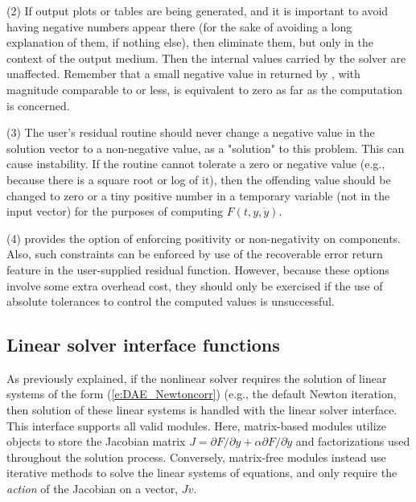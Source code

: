 (2) If output plots or tables are being generated, and it is important
to avoid having negative numbers appear there (for the sake of avoiding
a long explanation of them, if nothing else), then eliminate them, but
only in the context of the output medium.  Then the internal values carried
by the solver are unaffected.  Remember that a small negative value in 
returned by {\ida}, with magnitude comparable to  or less,
is equivalent to zero as far as the computation is concerned.

(3) The user's residual routine  should never change a
negative value in the solution vector  to a non-negative value,
as a "solution" to this problem.  This can cause instability.  If the
 routine cannot tolerate a zero or negative value (e.g., because
there is a square root or log of it), then the offending value should
be changed to zero or a tiny positive number in a temporary variable
(not in the input  vector) for the purposes of computing $F(t,y,\dot{y})$.

(4) {\ida} provides the option of enforcing positivity or non-negativity
on components.  Also, such constraints can be enforced by use of the
recoverable error return feature in the user-supplied residual function.
However, because these options involve some extra overhead cost, they
should only be exercised if the use of absolute tolerances to control
the computed values is unsuccessful.
\subsection{Linear solver interface functions}\label{sss:lin_solv_init}

As previously explained, if the nonlinear solver requires the solution of
linear systems of the form (\ref{e:DAE_Newtoncorr}) (e.g., the default Newton
iteration, then solution of these linear systems is handled with the
{\idals} linear solver interface.  This interface supports all valid
{\sunlinsol} modules.  Here, matrix-based {\sunlinsol} modules utilize
{\sunmatrix} objects to store the Jacobian matrix
$J = \partial{F}/\partial{y} + \alpha \partial{F}/\partial{\dot{y}}$
and factorizations used throughout the solution process.  Conversely,
matrix-free {\sunlinsol} modules instead use iterative methods to
solve the linear systems of equations, and only require the
\emph{action} of the Jacobian on a vector, $Jv$.

